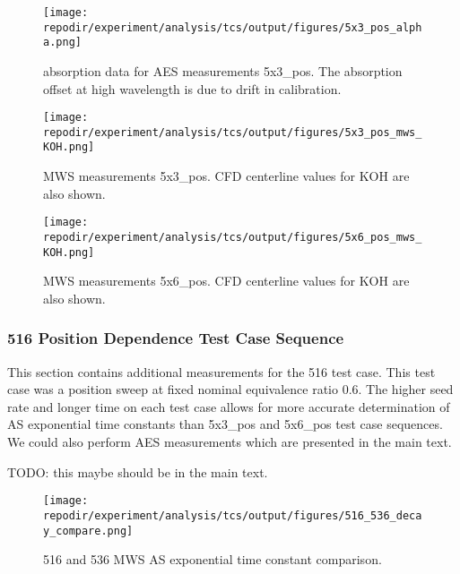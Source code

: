 \begin{figure}[]
\centering
\texttt{[image: \\repodir/experiment/analysis/tcs/output/figures/5x3\_pos\_alpha.png]}
\caption{absorption data for AES measurements 5x3\_pos. The absorption offset at high wavelength is due to drift in calibration.}
\label{fig:SI_5x3_pos_alpha}
\end{figure}


\begin{figure}[]
\centering
\texttt{[image: \\repodir/experiment/analysis/tcs/output/figures/5x3\_pos\_mws\_KOH.png]}
\caption{MWS measurements 5x3\_pos. CFD centerline values for KOH are also shown.}
\label{fig:SI_5x3_pos_mws_KOH}
\end{figure}


\begin{figure}[]
\centering
\texttt{[image: \\repodir/experiment/analysis/tcs/output/figures/5x6\_pos\_mws\_KOH.png]}
\caption{MWS measurements 5x6\_pos. CFD centerline values for KOH are also shown.}
\label{fig:SI_5x6_pos_mws_KOH}
\end{figure}




\clearpage
\subsubsection{516 Position Dependence Test Case Sequence}

This section contains additional measurements for the 516 test case. This test case was a position sweep at fixed nominal equivalence ratio 0.6. The higher seed rate and longer time on each test case allows for more accurate determination of AS exponential time constants than 5x3\_pos and 5x6\_pos test case sequences. We could also perform AES measurements which are presented in the main text. 

TODO: this maybe should be in the main text.

\begin{figure}[]
\centering
\texttt{[image: \\repodir/experiment/analysis/tcs/output/figures/516\_536\_decay\_compare.png]}
\caption{516 and 536 MWS AS exponential time constant comparison.}
\label{fig:SI_516_mws_decaytime}
\end{figure}


